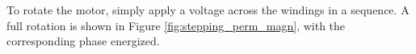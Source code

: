 \newpage
To rotate the motor, simply apply a voltage across the windings in a sequence. A full rotation is shown in Figure \ref{fig:stepping_perm_magn}, with the corresponding phase energized.

\begin{figure}[htp]
    \begin{center}
    \hfill
    \hfill
  	\hfill
    \end{center}
    

\end{figure}
